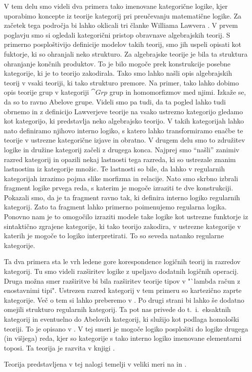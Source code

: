 \documentclass[../kategoricna_logika.tex]{subfiles}
\begin{document}
V tem delu smo videli dva primera tako imenovane kategorične logike, kjer uporabimo
koncepte iz teorije kategorij pri preučevanju matematične logike.
Za začetek tega področja bi lahko oklicali tri članke Williama Lawvera \cite{lawvere1963functorial,lawvere1964elementary,lawvere1971quantifiers}.
V prvem poglavju smo si ogledali kategorični pristop obravnave algebrajskih teorij.
S primerno posploštivijo definicije modelov takih teorij, smo jih uspeli opisati
kot fuktorje, ki so ohranjali neko strukturo.
Za algebrajske teorije je bila ta struktura ohranjanje končnih produktov.
To je bilo mogoče prek konstrukcije posebne kategorije, ki je to teorijo zakodirala.
Tako smo lahko našli opis algebrajskih teorij v vsaki teoriji, ki tako strukturo premore.
Na primer, tako lahko dobimo opis teorije grup v kategoriji $\cat{Grp}$ grup in
homomorfizmov med njimi. Izkaže se, da so to ravno Abelove grupe.
Videli smo pa tudi, da ta pogled lahko tudi obrnemo in z definicijo Lawverjeve teorije
na vsako ustrezno kategorijo gledamo kot kategorijo, ki predstavlja neko algebrajsko
teorijo. V takih kategorijah lahko nato definiramo njihovo interno logiko, s katero
lahko transformiramo enačbe te teorije v ustrezne kategorične izjave in obratno.
V drugem delu smo to združitev logike in družine kategorij začeli z drugega konca.
Najprej smo "`našli"' zanimiv razred kategorij in opazili nekaj lastnosti tega razreda,
ki so ustrezale znanim lastnostim iz kategorije množic. Te lastnosti so bile, da lahko
v regularnih kategorijah izrazimo pojma slike morfizma in relacije. Nato smo skrbno
izbrali fragment logike prvega reda, s katerim je mogoče izraziti te dve konstrukciji.
Pokazali smo, da je ta fragment ravno tak, ki definira interno logiko regularnih kategorij.
Zato ta fragment lahko primerno poimenujemo regularna logika.
Ponovno nam je to omogočilo izraziti modele take logike kot ustrezne funktorje iz sintaktično
zgrajene kategorije, ki tako teorijo zakodira, v ustrezne kategorije v katerih je
mogoče to logiko interpretirati. To so seveda natanko regularne kategorije.

Ta dva primera sta le vrh ledene gore korespondence logičnih teorij in razredov kategorij.
Tu smo videli razširitev logike z upeljavo dodatnih logičnih operacij. Druga možna smer
razširitve bi bila razširitev teorije tipov v "`lambda račun z enostavnimi tipi". Ustrezen
razred kategorij v tem primeru so kartezično zaprte kategorije. Več o tem si lahko preberemo
v \cite{seely1984locally}. Po drugi strani bi lahko še dodatno omejili strukturo regularnih
kategorij. Ta pot nas privede do t.\ i.\ eksaktnih kategorij in eventuelno do Abelovih kategorij,
ki služijo kot podlaga homološki teoriji. To je opisano v \cite{barr-exact-categories}.
V tej smeri je mogoče logiko posplošiti do logike drugega (in višjega) reda, kjer so
kategorije s tako interno logiko imenovane elementarni toposi. Ta teorija je razvita v
knjigi \cite{TJohnstone2002-TJOSOA-2}.

Teorija predstavljena v tej nalogi temelji v veliki meri na \cite{algebraic-logic} in \cite{barr-exact-categories}.
\end{document}
